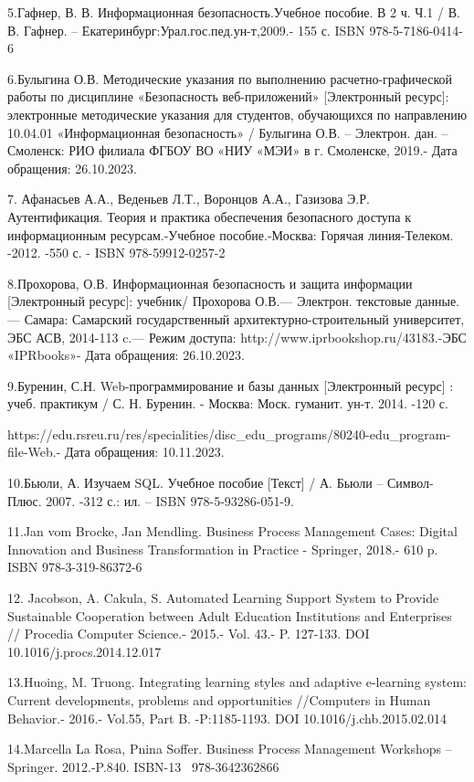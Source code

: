 5.Гафнер, В. В. Информационная безопасность.Учебное пособие. В 2 ч. Ч.1
/ В. В. Гафнер. -- Екатеринбург:Урал.гос.пед.ун-т,2009.- 155 с. ISBN
978-5-7186-0414-6

6.Булыгина О.В. Методические указания по выполнению расчетно-графической
работы по дисциплине «Безопасность веб-приложений» {[}Электронный
ресурс{]}: электронные методические указания для студентов, обучающихся
по направлению 10.04.01 «Информационная безопасность» / Булыгина О.В. --
Электрон. дан. -- Смоленск: РИО филиала ФГБОУ ВО «НИУ «МЭИ» в г.
Смоленске, 2019.- Дата обращения: 26.10.2023.

7. Афанасьев А.А., Веденьев Л.Т., Воронцов А.А., Газизова Э.Р.
Аутентификация. Теория и практика обеспечения безопасного доступа к
информационным ресурсам.-Учебное пособие.-Москва: Горячая линия-Телеком.
-2012. -550 с. - ISBN 978-59912-0257-2

8.Прохорова, О.В. Информационная безопасность и защита информации
{[}Электронный ресурс{]}: учебник/ Прохорова О.В.--- Электрон. текстовые
данные.--- Самара: Самарский государственный архитектурно-строительный
университет, ЭБС АСВ, 2014-113 c.--- Режим доступа:
http://www.iprbookshop.ru/43183.-ЭБС «IPRbooks»- Дата обращения:
26.10.2023.

9.Буренин, С.Н. Web-программирование и базы данных {[}Электронный
ресурс{]} : учеб. практикум / С. Н. Буренин. - Москва: Моск. гуманит.
ун-т. 2014. -120 с.

https://edu.rsreu.ru/res/specialities/disc\_edu\_programs/80240-edu\_program-file-Web.-
Дата обращения: 10.11.2023.

10.Бьюли, А. Изучаем SQL. Учебное пособие {[}Текст{]} / А. Бьюли --
Символ-Плюс. 2007. -312 с.: ил. -- ISBN 978-5-93286-051-9.

11.Jan vom Brocke, Jan Mendling. Business Process Management Cases:
Digital Innovation and Business Transformation in Practice - Springer,
2018.- 610 p. ISBN 978-3-319-86372-6

12. Jacobson, A. Cakula, S. Automated Learning Support System to Provide
Sustainable Cooperation between Adult Education Institutions and
Enterprises // Procedia Computer Science.- 2015.- Vol. 43.- P. 127-133.
DOI 10.1016/j.procs.2014.12.017

13.Huoing, M. Truong. Integrating learning styles and adaptive
e-learning system: Current developments, problems and opportunities
//Computers in Human Behavior.- 2016.- Vol.55, Part B. -P:1185-1193. DOI
10.1016/j.chb.2015.02.014

14.Marcella La Rosa, Pnina Soffer. Business Process Management Workshops
-- Springer. 2012.-P.840. ISBN-13 ‎~978-3642362866

